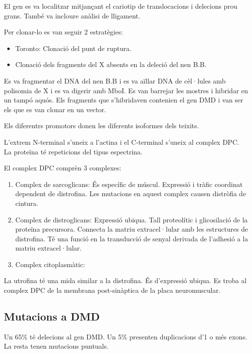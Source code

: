 El gen es va localitzar mitjançant el cariotip de translocacions i delecions prou grans. També va incloure anàlisi de lligament.

Per clonar-lo es van seguir 2 estratègies:
\begin{itemize}
\item Toronto: Clonació del punt de ruptura.

\item Clonació dels fragments del X absents en la deleció del nen B.B.
\end{itemize}

Es va fragmentar el DNA del nen B.B i es va aïllar DNA de cèl·lules amb polisomia de X i es va digerir amb MboI. Es van barrejar les mostres i hibridar en un tampó aquós. Els fragments que s'hibridaven contenien el gen DMD i van ser els que es van clonar en un vector.

Els diferentrs promotors donen les diferents isoformes dels teixits.

L'extrem N-terminal s'uneix a l'actina i el C-terminal s'uneix al complex DPC. La proteïna té repeticions del tipus espectrina.

El complex DPC comprèn 3 complexes:
\begin{enumerate}
\item Complex de sarcoglicans: És específic de múscul. Expressió i tràfic coordinat dependent de distrofina. Les mutacions en aquest complex causen distròfia de cintura.
  
\item Complex de distroglicans: Expressió ubiqua. Tall proteolític i glicosilació de la proteïna precursora. Connecta la matriu extracel·lular amb les estructures de distrofina. Té una funció en la transducció de senyal derivada de l'adhesió a la matriu extracel·lular.
  
\item Complex citoplasmàtic:
\end{enumerate}

La utrofina té una mida similar a la distrofina. És d'expressió ubiqua. Es troba al complex DPC de la membrana post-sinàptica de la placa neuromuscular.

\subsection{Mutacions a DMD}
\label{sec:mutacions-DMD}
Un 65\% té delecions al gen DMD. Un 5\% presenten duplicacions d'1 o més exons. La resta tenen mutacions puntuals.

